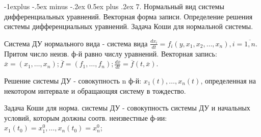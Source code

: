 \documentclass[unicode,10pt, landscape]{article}
\makeatletter
\renewcommand{\subsection}{\@startsection{subsection}{2}{0mm}%
                                {-1explus -.5ex minus -.2ex}%
                                {0.5ex plus .2ex}%
                                {\normalfont\normalsize\bfseries}}
\makeatother
\begin{document}
\subsection{7. Нормальный вид системы дифференциальных уравнений. Векторная форма записи. Определение решения системы дифференциальных уравнений. Задача Коши для нормальной системы.}
\begin{Def}
Система ДУ нормального вида - система вида $\frac{dx_i}{dt} = f_i(y, x_1, x_2, \ldots, x_n), i = \overline{1,n}$. Притом число неизв. ф-й равно числу уравнений. Векторная запись: $\overline{x} = (x_1, \ldots, x_n); \overline{f} = (f_1, \ldots, f_n); \frac{d\overline{x}}{dt} = \overline{f}(t, \overline{x})$.
\end{Def}
\begin{Def}
Решение системы ДУ - совокупность n ф-й: $x_1(t), \ldots, x_n(t)$, определенная на некотором интервале и обращающяя систему в тождество.
\end{Def}
\begin{Def}
Задача Коши для норма. системы ДУ - совокупность системы ДУ и начальных условий, которым должны соотв. неизвестные ф-ии: $x_1(t_0) = x_1^0, \ldots, x_n(t_0) = x_n^0$;
\end{Def}

\end{document}
